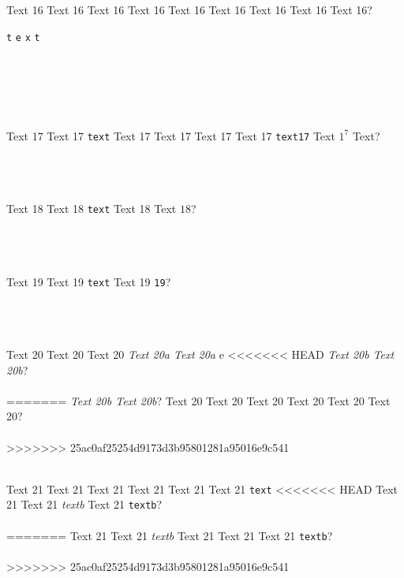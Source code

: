 \documentclass[9pt]{exam}
\begin{document}
\begin{questions}
\question
    Text 16 Text 16 Text 16 Text 16 Text 16 Text 16 Text 16
    Text 16 Text 16?\\
    \begin{oneparchoices}
     \choice \texttt{t}
     \choice \texttt{e}
     \choice \texttt{x}
     \choice \texttt{t}
    \end{oneparchoices}\\\\
    \\\\
    \makebox[0.9\textwidth]{\enspace\hrulefill{}}

\question
    Text 17 Text 17 \texttt{text} Text 17 Text 17 Text 17
    Text 17 \texttt{text17} Text $1^7$ Text?\\\\
    \makebox[0.9\textwidth]{\$ \enspace\hrulefill}\\\\
    \makebox[0.9\textwidth]{\enspace\hrulefill}

\question
    Text 18 Text 18 \texttt{text} Text 18 Text $18$?\\\\
    \makebox[0.9\textwidth]{\$ \enspace\hrulefill}\\\\
    \makebox[0.9\textwidth]{\enspace\hrulefill}

\question
    Text 19 Text 19 \texttt{text} Text 19 \texttt{19}?\\\\
    \makebox[0.9\textwidth]{\$ \enspace\hrulefill}\\\\
    \makebox[0.9\textwidth]{\enspace\hrulefill}

\question
    Text 20 Text 20 Text 20 \emph{Text 20a Text 20a} e
<<<<<<< HEAD
    \emph{Text 20b Text 20b}?\\\\
=======
    \emph{Text 20b Text 20b}? Text 20 Text 20 Text 20
    Text 20 Text 20 Text 20?\\\\
>>>>>>> 25ac0af25254d9173d3b95801281a95016e9c541
    \makebox[0.9\textwidth]{\$ \enspace\hrulefill}\\\\
    \makebox[0.9\textwidth]{\enspace\hrulefill}

\question
    Text 21 Text 21 Text 21 Text 21 Text 21 Text 21 \texttt{text}
<<<<<<< HEAD
    Text 21 Text 21 \emph{textb} Text 21 \texttt{textb}?\\\\
=======
    Text 21 Text 21 \emph{textb} Text 21 Text 21 Text 21 \texttt{textb}?\\\\
>>>>>>> 25ac0af25254d9173d3b95801281a95016e9c541
    \makebox[0.9\textwidth]{\$ \enspace\hrulefill}\\\\
    \makebox[0.9\textwidth]{\enspace\hrulefill}


\end{questions}
\end{document}
